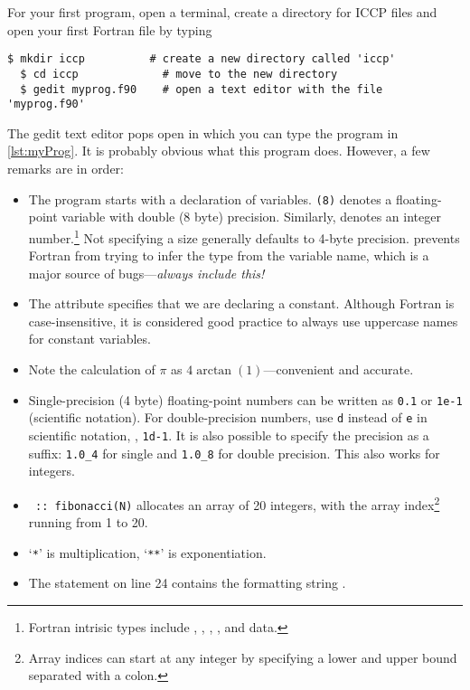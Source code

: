 For your first program, open a terminal, create a directory for ICCP files and open your first Fortran file by typing
\begin{lstlisting}[style=prompt, nolol]
  $ mkdir iccp          # create a new directory called 'iccp'
  $ cd iccp             # move to the new directory
  $ gedit myprog.f90    # open a text editor with the file 'myprog.f90'
\end{lstlisting}
The gedit text editor pops open in which you can type the program in \autoref{lst:myProg}.
It is probably obvious what this program does. However, a few remarks are in order:
\begin{itemize}
  \item The program starts with a declaration of variables.
    \texttt{(8)} denotes a floating-point variable with double (8 byte) precision. 
    Similarly,  denotes an integer number.\footnote{Fortran intrisic types include , , , , and  data.}
    Not specifying a size generally defaults to 4-byte precision.
     prevents Fortran from trying to infer the type from the variable name, which is a major source of bugs---\emph{always include this!}
  \item The attribute  specifies that we are declaring a constant.
    Although Fortran is case-insensitive, it is considered good practice to always use uppercase names for constant variables.
  \item Note the calculation of $\pi$ as $4\arctan(1)$---convenient and accurate.
  \item Single-precision (4 byte) floating-point numbers can be written as \texttt{0.1} or \texttt{1e-1} (scientific notation). 
    For double-precision numbers, use \texttt{d} instead of \texttt{e} in scientific notation, \eg, \texttt{1d-1}. 
    It is also possible to specify the precision as a suffix: \texttt{1.0\_4} for single and \texttt{1.0\_8} for double precision. 
    This also works for integers.
  \item \texttt{ :: fibonacci(N)} allocates an array of 20 
    integers, with the array index\footnote{Array indices can start at 
    any integer by specifying a lower and upper bound separated with a colon.} running from 1 to 20.
  \item `\texttt{*}' is multiplication, `\texttt{**}' is exponentiation.
  \item The  statement on line 24 contains the formatting string . 

\end{itemize}
